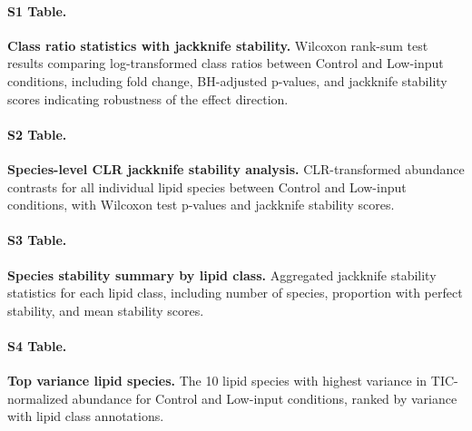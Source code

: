\documentclass[9pt,twocolumn,twoside]{rilabRxiv}
\begin{document}
\paragraph*{S1 Table.}
\makeatletter
\def\@currentlabelname{S1 Table} 
\makeatother
\label{S1_Table}                                                                                   
\textbf{Class ratio statistics with jackknife stability.} Wilcoxon rank-sum test results comparing log-transformed class ratios between Control and Low-input conditions, including fold change, BH-adjusted p-values, and jackknife stability scores indicating robustness of the effect direction.
                                                                                                 
\paragraph*{S2 Table.}
\makeatletter
\def\@currentlabelname{S2 Table} 
\makeatother
\label{S2_Table}                                                                                   
\textbf{Species-level CLR jackknife stability analysis.} CLR-transformed abundance contrasts for all individual lipid species between Control and Low-input conditions, with Wilcoxon test p-values  
and jackknife stability scores.                                                                    
                                                                                                 
\paragraph*{S3 Table.}
\makeatletter
\def\@currentlabelname{S3 Table} 
\makeatother
\label{S3_Table}                                                                                   
\textbf{Species stability summary by lipid class.} Aggregated jackknife stability statistics for each lipid class, including number of species, proportion with perfect stability, and mean stability scores.                                                                                  
                                                                                                 
\paragraph*{S4 Table.}
\makeatletter
\def\@currentlabelname{S4 Table} 
\makeatother
\label{S4_Table}                                                                                   
\textbf{Top variance lipid species.} The 10 lipid species with highest variance in TIC-normalized abundance for Control and Low-input conditions, ranked by variance with lipid class annotations.    
                                                                                                 
\end{document}
